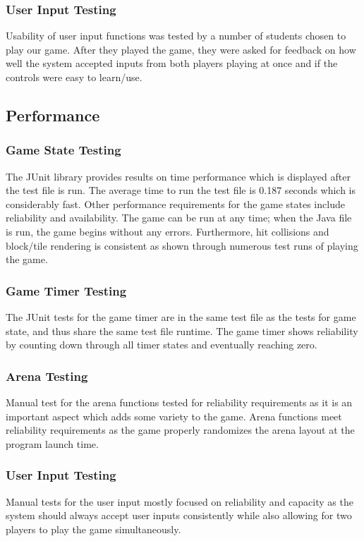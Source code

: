 \documentclass[12pt, letterpaper]{article}
\begin{document}
\subsubsection{User Input Testing}
\indent \indent Usability of user input functions was tested by a number of students chosen to play our game. After they played the game, they were asked for feedback on how well the system accepted inputs from both players playing at once and if the controls were easy to learn/use. 
\subsection{Performance}
\subsubsection{Game State Testing}
\indent \indent The JUnit library provides results on time performance which is displayed after the test file is run. The average time to run the test file is 0.187 seconds which is considerably fast. Other performance requirements for the game states include reliability and availability. The game can be run at any time; when the Java file is run, the game begins without any errors. Furthermore, hit collisions and block/tile rendering is consistent as shown through numerous test runs of playing the game.
\subsubsection{Game Timer Testing}
\indent \indent The JUnit tests for the game timer are in the same test file as the tests for game state, and thus share the same test file runtime. The game timer shows reliability by counting down through all timer states and eventually reaching zero.
\subsubsection{Arena Testing}
\indent \indent Manual test for the arena functions tested for reliability requirements as it is an important aspect which adds some variety to the game. Arena functions meet reliability requirements as the game properly randomizes the arena layout at the program launch time.
\subsubsection{User Input Testing}
\indent \indent Manual tests for the user input mostly focused on reliability and capacity as the system should always accept user inputs consistently while also allowing for two players to play the game simultaneously.
\end{document}
